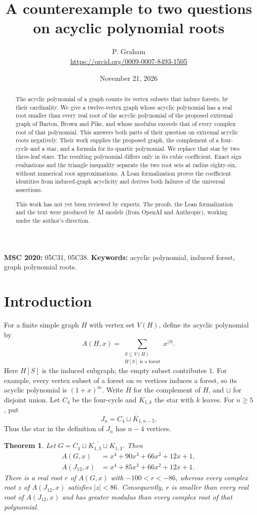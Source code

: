 \documentclass[11pt]{article}
\title{A counterexample to two questions on acyclic polynomial roots}
\author{P. Graham\\ \small\url{https://orcid.org/0009-0007-8493-1505}}
\date{November 21, 2026}
\newtheorem{theorem}{Theorem}
\begin{document}
\maketitle
\begin{abstract}
The acyclic polynomial of a graph counts its vertex subsets that induce forests, by their cardinality. We give a twelve-vertex graph whose acyclic polynomial has a real root smaller than every real root of the acyclic polynomial of the proposed extremal graph of Barton, Brown and Pike, and whose modulus exceeds that of every complex root of that polynomial. This answers both parts of their question on extremal acyclic roots negatively. Their work supplies the proposed graph, the complement of a four-cycle and a star, and a formula for its quartic polynomial. We replace that star by two three-leaf stars. The resulting polynomial differs only in its cubic coefficient. Exact sign evaluations and the triangle inequality separate the two root sets at radius eighty-six, without numerical root approximations. A Lean formalization proves the coefficient identities from induced-graph acyclicity and derives both failures of the universal assertions.

This work has not yet been reviewed by experts. The proofs, the Lean formalization and the text were produced by AI models (from OpenAI and Anthropic), working under the author's direction.
\end{abstract}
\medskip
\noindent\textbf{MSC 2020:} 05C31, 05C38.\quad
\textbf{Keywords:} acyclic polynomial, induced forest, graph polynomial roots.

\section{Introduction}
For a finite simple graph $H$ with vertex set $V(H)$, define its acyclic polynomial by
\[
 A(H,x)=\sum_{\substack{S\subseteq V(H)\\H[S]\text{ is a forest}}}x^{|S|}.
\]
Here $H[S]$ is the induced subgraph; the empty subset contributes $1$.
For example, every vertex subset of a forest on $m$ vertices induces a forest, so its acyclic polynomial is $(1+x)^m$.
Write $\overline H$ for the complement of $H$, and $\sqcup$ for disjoint union. Let $C_4$ be the four-cycle and $K_{1,k}$ the star with $k$ leaves. For $n\geq5$, put
\[
 J_n=\overline{C_4\sqcup K_{1,n-5}}.
\]
Thus the star in the definition of $J_n$ has $n-4$ vertices.

\begin{theorem}\label{thm:main}
Let $G=\overline{C_4\sqcup K_{1,3}\sqcup K_{1,3}}$. Then
\begin{align*}
 A(G,x)&=x^4+90x^3+66x^2+12x+1,\\
 A(J_{12},x)&=x^4+85x^3+66x^2+12x+1.
\end{align*}
There is a real root $r$ of $A(G,x)$ with $-100<r<-86$, whereas every complex root $z$ of $A(J_{12},x)$ satisfies $|z|<86$. Consequently, $r$ is smaller than every real root of $A(J_{12},x)$ and has greater modulus than every complex root of that polynomial.
\end{theorem}
\end{document}
